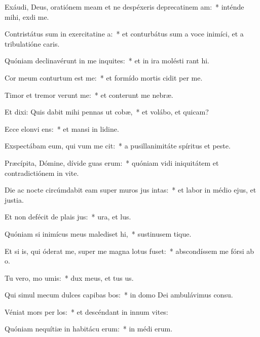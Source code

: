 \item Exáudi, Deus, oratiónem meam et ne despéxeris deprecatinem am:~* inténde mihi,  exdi me.
\item Contristátus sum in exercitatine a:~* et conturbátus sum a voce inimíci, et a tribulatióne caris.
\item Quóniam declinavérunt in me inquites:~* et in ira molésti rant hi.
\item Cor meum conturtum est  me:~* et formído mortis cidit per me.
\item Timor et tremor verunt  me:~* et conterunt me nebræ.
\item Et dixi: Quis dabit mihi pennas ut cobæ,~* et volábo, et quicam?
\item Ecce elonvi ens:~* et mansi in lidine.
\item Exspectábam eum, qui vum me cit:~* a pusillanimitáte spíritus et peste.
\item Præcípita, Dómine, dívide guas erum:~* quóniam vidi iniquitátem et contradictiónem in vite.
\item Die ac nocte circúmdabit eam super muros jus intas:~* et labor in médio ejus, et justia.
\item Et non defécit de plais jus:~* ura, et lus.
\item Quóniam si inimícus meus malediset hi,~* sustinusem tique.
\item Et si is, qui óderat me, super me magna lotus fuset:~* abscondíssem me fórsi ab o.
\item Tu vero, mo umis:~* dux meus, et tus us.
\item Qui simul mecum dulces capibas bos:~* in domo Dei ambulávimus  consu.
\item Véniat mors per los:~* et descéndant in innum vites:
\item Quóniam nequítiæ in habitácu erum:~* in médi erum.
